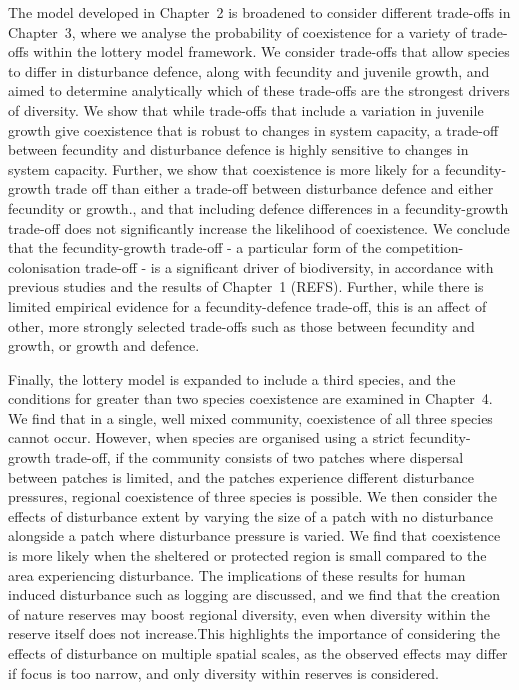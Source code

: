 The model developed in Chapter~2 is broadened to consider different trade-offs in Chapter~3, where we analyse the probability of coexistence for a variety of trade-offs within the lottery model framework. We consider trade-offs that allow species to differ in disturbance defence, along with fecundity and juvenile growth, and aimed to determine analytically which of these trade-offs are the strongest drivers of diversity. We show that while trade-offs that include a variation in juvenile growth give coexistence that is robust to changes in system capacity, a trade-off between fecundity and disturbance defence is highly sensitive to changes in system capacity. Further, we show that coexistence is more likely for a fecundity-growth trade off than either a trade-off between disturbance defence and either fecundity or growth., and that including defence differences in a fecundity-growth trade-off does not significantly increase the likelihood of coexistence. We conclude that the fecundity-growth trade-off - a particular form of the competition-colonisation trade-off - is a significant driver of biodiversity, in accordance with previous studies and the results of Chapter~1 (REFS). Further, while there is limited empirical evidence for a fecundity-defence trade-off, this is an affect of other, more strongly selected trade-offs such as those between fecundity and growth, or growth and defence.

Finally, the lottery model is expanded to include a third species, and the conditions for greater than two species coexistence are examined in Chapter~4. We find that in a single, well mixed community, coexistence of all three species cannot occur. However, when species are organised using a strict fecundity-growth trade-off, if the community consists of two patches where dispersal between patches is limited, and the patches experience different disturbance pressures, regional coexistence of three species is possible. We then consider the effects of disturbance extent by varying the size of a patch with no disturbance alongside a patch where disturbance pressure is varied. We find that coexistence is more likely when the sheltered or protected region is small compared to the area experiencing disturbance. The implications of these results for human induced disturbance such as logging are discussed, and we find that the creation of nature reserves may boost regional diversity, even when diversity within the reserve itself does not increase.This highlights the importance of considering the effects of disturbance on multiple spatial scales, as the observed effects may differ if focus is too narrow, and only diversity within reserves is considered.

